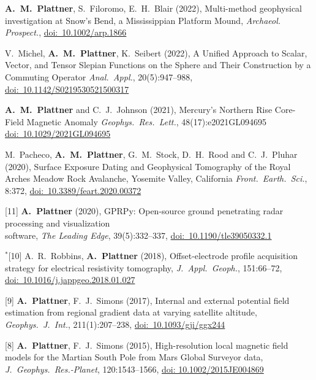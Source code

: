 \documentclass[10pt]{article}
\begin{document}
\spcp
\shift[15] \textbf{A.~M.~Plattner}, S.~Filoromo, E.~H.~Blair (2022), Multi-method geophysical
investigation at Snow's Bend, a Mississippian Platform Mound,
\emph{Archaeol. Prospect.}, \href{https://doi.org/10.1002/arp.1866}{doi:~10.1002/arp.1866}

\spcp
\shift[14] V.~Michel, \textbf{A.~M.~Plattner}, K.~Seibert (2022),
A Unified Approach to Scalar, Vector, and Tensor Slepian Functions on the Sphere and Their Construction by a Commuting Operator
\emph{Anal.~Appl.}, 20(5):947--988, \href{https://doi.org/10.1142/S0219530521500317}{doi:~10.1142/S0219530521500317}

\spcp
\shift[13] \textbf{A.~M.~Plattner} and C.~J.~Johnson (2021),
Mercury's Northern Rise Core-Field Magnetic Anomaly
\emph{Geophys.~Res.~Lett.}, 48(17):e2021GL094695 \href{https://doi.org/10.1029/2021GL094695}{doi:~10.1029/2021GL094695}

\spcp
\grshift \gr[12] M.~Pacheco, \textbf{A.~M.~Plattner}, G.~M.~Stock, D.~H.~Rood and C.~J.~Pluhar (2020),
Surface Exposure Dating and Geophysical Tomography of the Royal Arches Meadow Rock Avalanche, Yosemite Valley, California
\emph{Front.~Earth.~Sci.}, 8:372, \href{https://www.frontiersin.org/articles/10.3389/feart.2020.00372/full}{doi:~10.3389/feart.2020.00372} 

\spcp
\hspace{-0.675cm}[11] \textbf{A.~Plattner} (2020), GPRPy: Open-source ground penetrating radar processing and visualization \\software, \emph{The Leading Edge}, 39(5):332--337, \href{https://doi.org/10.1190/tle39050332.1}{doi:~10.1190/tle39050332.1}

\spcp
\hspace{-0.835cm}$^*$[10] A.~R.~Robbins, \textbf{A.~Plattner} (2018),
Offset-electrode profile acquisition strategy for
electrical resistivity tomography,
\emph{J.~Appl.~Geoph.}, 151:66--72, \href{https://www.sciencedirect.com/science/article/pii/S0926985117308376?via%3Dihub}{doi:~10.1016/j.jappgeo.2018.01.027} 


\spcp
\hspace{-0.5cm}[9] \textbf{A.~Plattner}, F.~J.~Simons (2017),
Internal and external potential field estimation
from regional gradient data at varying satellite altitude,
\emph{Geophys.~J.~Int.}, 211(1):207--238, \href{https://academic.oup.com/gji/article-lookup/doi/10.1093/gji/ggx244}{doi:~10.1093/gji/ggx244} 

\spcp
\hspace{-0.5cm}[8] \textbf{A.~Plattner}, F.~J.~Simons (2015),
High-resolution local magnetic field models for the
Martian South Pole
from Mars Global Surveyor data,
\emph{J.~Geophys.~Res.-Planet}, 120:1543--1566,
\href{http://onlinelibrary.wiley.com/doi/10.1002/2015JE004869/abstract}{doi: 10.1002/2015JE004869}
\end{document}

